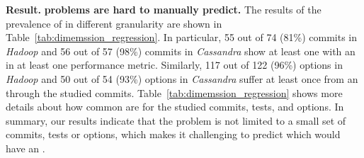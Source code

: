 \noindent \textbf{Result.}
\noindent \textbf{\inconsistent problems are hard to manually predict.} The results of the prevalence of \inconsistent in different granularity are shown in Table~\ref{tab:dimemssion_regression}. In particular, 55 out of 74 (81\%) commits in \emph{Hadoop} and 56 out of 57 (98\%) commits in \emph{Cassandra} show at least one \instance with an \inconsistent in at least one performance metric. %
Similarly, 117 out of 122 (96\%) options in \emph{Hadoop} and 50 out of 54 (93\%) options in \emph{Cassandra} suffer at least once from an \inconsistent through the studied commits. Table~\ref{tab:dimemssion_regression} shows more details about how common are \inconsistent for the studied commits, tests, and options. 
In summary, our results indicate that the \inconsistent problem is not limited to a small set of commits, tests or options, which makes it challenging to predict which \instance would have an \inconsistent.

